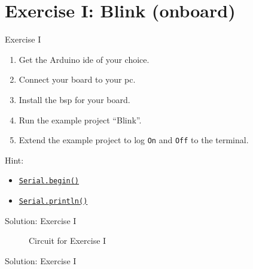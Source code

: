 \documentclass[aspectratio=169]{beamer}
\begin{document}
\section{Exercise I: Blink  (onboard)}

\begin{frame}
    \begin{exampleblock}{Exercise I}
        \begin{enumerate}
            \item Get the Arduino\textregistered{} \acs{ide} of your choice.
            \item Connect your board to your \acs{pc}.
            \item Install the \ac{bsp} for your board.
            \item Run the example project ``Blink''.
            \item Extend the example project to log \texttt{On} and \texttt{Off} to the terminal.%
        \end{enumerate}
        \par Hint:
        \begin{itemize}
            \item \href{https://www.arduino.cc/reference/en/language/functions/communication/serial/begin/}{\texttt{Serial.begin()}}
            \item \href{https://www.arduino.cc/reference/en/language/functions/communication/serial/println/}{\texttt{Serial.println()}}
        \end{itemize}
    \end{exampleblock}
\end{frame}

\begin{frame}{Solution: Exercise I}
    \begin{figure}
        \caption{Circuit for Exercise I}
    \end{figure}
\end{frame}

\begin{frame}{Solution: Exercise I}
    \begin{listing}[H]
        \caption{Solution for Exercise I.}
        \label{lst:arduino:exercise:1:solution}
    \end{listing}
\end{frame}
\end{document}
